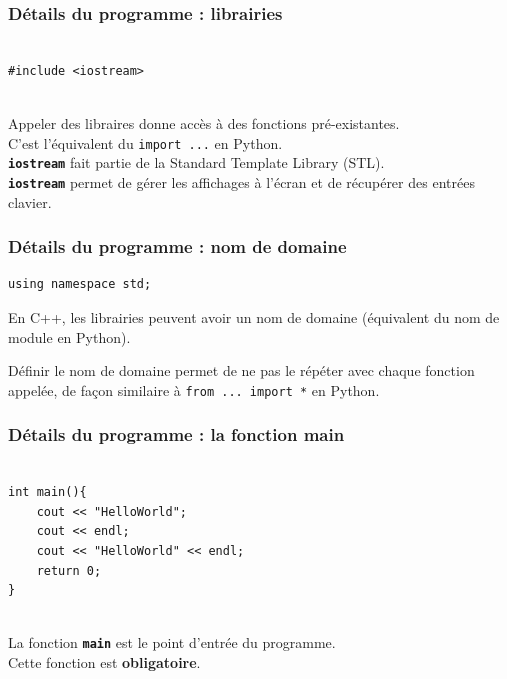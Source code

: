 \begin{frame}[fragile]
    \frametitle{Détails du programme : librairies}
    \begin{verbatim}
        
#include <iostream>
        
    \end{verbatim}

    Appeler des libraires donne accès à des fonctions pré-existantes. \\
    C'est l'équivalent du \texttt{import ...} en Python.\\

    \texttt{\textbf{iostream}} fait partie de la Standard Template Library (STL).\\
    \texttt{\textbf{iostream}} permet de gérer les affichages à l'écran et de récupérer des entrées clavier.
\end{frame}


\begin{frame}[fragile]
    \frametitle{Détails du programme : nom de domaine}
    \begin{verbatim}
using namespace std;
    \end{verbatim}

    En C++, les librairies peuvent avoir un nom de domaine (équivalent du nom de module en Python).

    Définir le nom de domaine permet de ne pas le répéter avec chaque fonction appelée, de façon similaire à \texttt{from ... import *} en Python.

\end{frame}

\begin{frame}[fragile]
    \frametitle{Détails du programme : la fonction main}
    \begin{verbatim}
        
int main(){
    cout << "HelloWorld";
    cout << endl;
    cout << "HelloWorld" << endl;
    return 0;
}
        
    \end{verbatim}

    La fonction \texttt{\textbf{main}} est le point d'entrée du programme.\\
    Cette fonction est \textbf{obligatoire}.
\end{frame}


